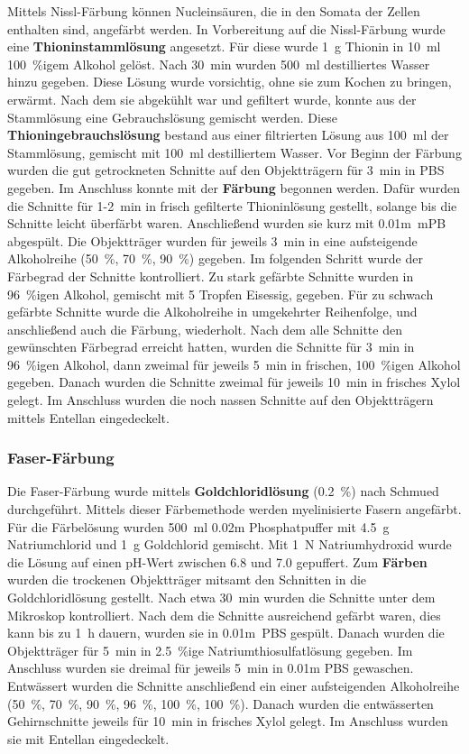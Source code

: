 Mittels Nissl-Färbung können Nucleinsäuren, die in den Somata der Zellen enthalten sind, angefärbt werden. In Vorbereitung auf die Nissl-Färbung wurde eine \textbf{Thioninstammlösung} angesetzt. Für diese wurde 1~g Thionin in 10~ml 100~\%igem Alkohol gelöst. Nach 30~min wurden 500~ml destilliertes Wasser hinzu gegeben. Diese Lösung wurde vorsichtig, ohne sie zum Kochen zu bringen, erwärmt. Nach dem sie abgekühlt war und gefiltert wurde, konnte aus der Stammlösung eine Gebrauchslösung gemischt werden. Diese \textbf{Thioningebrauchslösung} bestand aus einer filtrierten Lösung aus 100~ml der Stammlösung, gemischt mit 100~ml destilliertem Wasser. Vor Beginn der Färbung wurden die gut getrockneten Schnitte auf den Objektträgern für 3~min in PBS gegeben. Im Anschluss konnte mit der \textbf{Färbung} begonnen werden. Dafür wurden die Schnitte für 1-2~min in frisch gefilterte Thioninlösung gestellt, solange bis die Schnitte leicht überfärbt waren. Anschließend wurden sie kurz mit 0.01m~mPB abgespült. Die Objektträger wurden für jeweils 3~min in eine aufsteigende Alkoholreihe (50~\%, 70~\%, 90~\%) gegeben. Im folgenden Schritt wurde der Färbegrad der Schnitte kontrolliert. Zu stark gefärbte Schnitte wurden in 96~\%igen Alkohol, gemischt mit 5 Tropfen Eisessig, gegeben. Für zu schwach gefärbte Schnitte wurde die Alkoholreihe in umgekehrter Reihenfolge, und anschließend auch die Färbung, wiederholt. Nach dem alle Schnitte den gewünschten Färbegrad erreicht hatten, wurden die Schnitte für 3~min in 96~\%igen Alkohol, dann zweimal für jeweils 5~min in frischen, 100~\%igen Alkohol gegeben. Danach wurden die Schnitte zweimal für jeweils 10~min in frisches Xylol gelegt. Im Anschluss wurden die noch nassen Schnitte auf den Objektträgern mittels Entellan eingedeckelt. 

\subsubsection{Faser-Färbung}

Die Faser-Färbung wurde mittels \textbf{Goldchloridlösung} (0.2~\%) nach Schmued durchgeführt. Mittels dieser Färbemethode werden myelinisierte Fasern angefärbt. Für die Färbelösung wurden 500~ml 0.02m Phosphatpuffer mit 4.5~g Natriumchlorid und 1~g Goldchlorid gemischt. Mit 1~N Natriumhydroxid wurde die Lösung auf einen pH-Wert zwischen 6.8 und 7.0 gepuffert. Zum \textbf{Färben} wurden die trockenen Objektträger mitsamt den Schnitten in die Goldchloridlösung gestellt. Nach etwa 30~min wurden die Schnitte unter dem Mikroskop kontrolliert. Nach dem die Schnitte ausreichend gefärbt waren, dies kann bis zu 1~h dauern, wurden sie in 0.01m~PBS gespült. Danach wurden die Objektträger für 5~min in 2.5~\%ige Natriumthiosulfatlösung gegeben. Im Anschluss wurden sie dreimal für jeweils 5~min in 0.01m PBS gewaschen. Entwässert wurden die Schnitte anschließend ein einer aufsteigenden Alkoholreihe (50~\%, 70~\%, 90~\%, 96~\%, 100~\%, 100~\%). Danach wurden die entwässerten Gehirnschnitte jeweils für 10~min in frisches Xylol gelegt. Im Anschluss wurden sie mit Entellan eingedeckelt.

